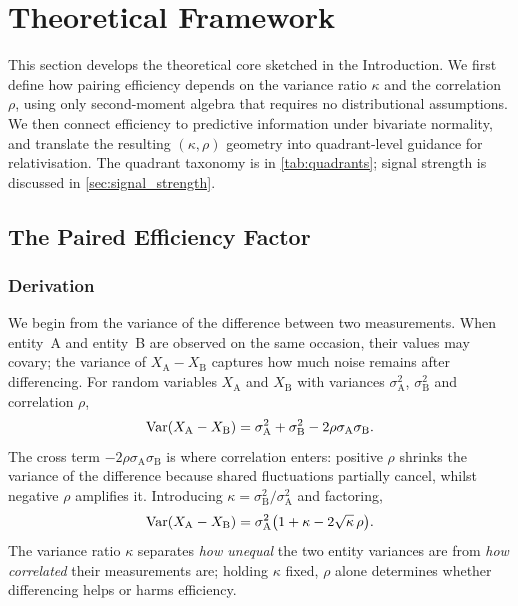 \section{Theoretical Framework}
\label{sec:theory}

This section develops the theoretical core sketched in the Introduction. We first define how pairing efficiency depends on the variance ratio $\kappa$ and the correlation $\rho$, using only second-moment algebra that requires no distributional assumptions. We then connect efficiency to predictive information under bivariate normality, and translate the resulting $(\kappa,\rho)$ geometry into quadrant-level guidance for relativisation. The quadrant taxonomy is in \cref{tab:quadrants}; signal strength is discussed in \cref{sec:signal_strength}.

\subsection{The Paired Efficiency Factor}

\subsubsection{Derivation}

We begin from the variance of the difference between two measurements. When entity~A and entity~B are observed on the same occasion, their values may covary; the variance of $X_{\mathrm{A}}-X_{\mathrm{B}}$ captures how much noise remains after differencing. For random variables $X_{\mathrm{A}}$ and $X_{\mathrm{B}}$ with variances $\sigma^{2}_{\mathrm{A}}$, $\sigma^{2}_{\mathrm{B}}$ and correlation $\rho$,
\begin{equation}
  \operatorname{Var}(X_{\mathrm{A}} - X_{\mathrm{B}}) = \sigma^{2}_{\mathrm{A}} + \sigma^{2}_{\mathrm{B}} - 2\rho\sigma_{\mathrm{A}}\sigma_{\mathrm{B}}.
  \label{eq:var_sum}
\end{equation}
The cross term $-2\rho\sigma_{\mathrm{A}}\sigma_{\mathrm{B}}$ is where correlation enters: positive $\rho$ shrinks the variance of the difference because shared fluctuations partially cancel, whilst negative $\rho$ amplifies it. Introducing $\kappa=\sigma^{2}_{\mathrm{B}}/\sigma^{2}_{\mathrm{A}}$ and factoring,
\begin{equation}
  \operatorname{Var}(X_{\mathrm{A}} - X_{\mathrm{B}}) = \sigma^{2}_{\mathrm{A}}\bigl(1 + \kappa - 2\sqrt{\kappa}\,\rho\bigr).
  \label{eq:var_factored}
\end{equation}
The variance ratio $\kappa$ separates \emph{how unequal} the two entity variances are from \emph{how correlated} their measurements are; holding $\kappa$ fixed, $\rho$ alone determines whether differencing helps or harms efficiency.

